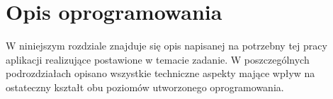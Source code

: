 \chapter{Opis oprogramowania}
\label{cha:software}

W niniejszym rozdziale znajduje się opis napisanej na potrzebny tej pracy aplikacji realizujące postawione w temacie zadanie. W poszczególnych podrozdziałach opisano wszystkie techniczne aspekty mające wpływ na ostateczny kształt obu poziomów utworzonego oprogramowania.




